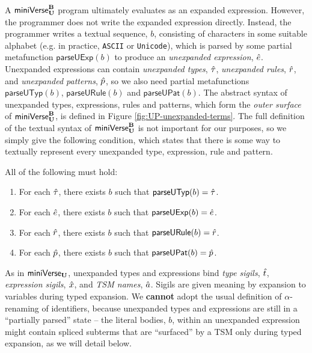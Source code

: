 A $\mathsf{miniVerse}_\textbf{U}^\textbf{B}$ program ultimately evaluates as an expanded expression. However, the programmer does not write the expanded expression directly. Instead, the programmer writes a textual sequence, $b$, consisting of characters in some suitable alphabet (e.g. in practice, \texttt{ASCII} or \texttt{Unicode}), which is parsed by some partial metafunction $\mathsf{parseUExp}(b)$ to produce an \emph{unex\-panded expression}, ${\hat e}$. Unexpanded expressions can contain \emph{unexpanded types}, ${\hat\tau}$, \emph{unexpanded rules}, $\hat{r}$, and \emph{unexpanded patterns}, $\hat{p}$, so we also need partial metafunctions $\mathsf{parseUTyp}(b)$, $\mathsf{parseURule}(b)$ and $\mathsf{parseUPat}(b)$. The abstract syntax of unexpanded types, expressions, rules and patterns, which form  the \emph{outer surface} of $\mathsf{miniVerse}_\textbf{U}^\textbf{B}$, is defined in Figure \ref{fig:UP-unexpanded-terms}. The full definition of the textual syntax of $\mathsf{miniVerse}_\textbf{U}^\textbf{B}$ is not important for our purposes, so we simply give the following condition, which states that there is some way to textually represent every unexpanded type, expression, rule and pattern. %
\begin{condition} All of the following must hold:
\begin{enumerate}
\item For each ${\hat\tau}$, there exists $b$ such that $\mathsf{parseUTyp}(b)={\hat\tau}$. 
\item For each ${\hat e}$, there exists $b$ such that $\mathsf{parseUExp}(b)={\hat e}$.
\item For each $\hat{r}$, there exists $b$ such that $\mathsf{parseURule}(b)=\hat{r}$.
\item For each $\hat{p}$, there exists $b$ such that $\mathsf{parseUPat}(b)=\hat{p}$.
\end{enumerate}
\end{condition}

As in $\mathsf{miniVerse}_\textbf{U}$, unexpanded types and expressions bind \emph{type sigils}, ${\hat{t}}$, \emph{expression sigils}, ${\hat x}$, and \emph{TSM names}, $\hat{a}$. Sigils are given meaning by expansion to variables during typed expansion. We \textbf{cannot} adopt the usual definition of $\alpha$-renaming of identifiers, because unexpanded types and expressions are still in a ``partially parsed'' state -- the literal bodies, $b$, within an unexpanded expression might contain spliced subterms that are ``surfaced'' by a TSM only during typed expansion, as we will detail below.

